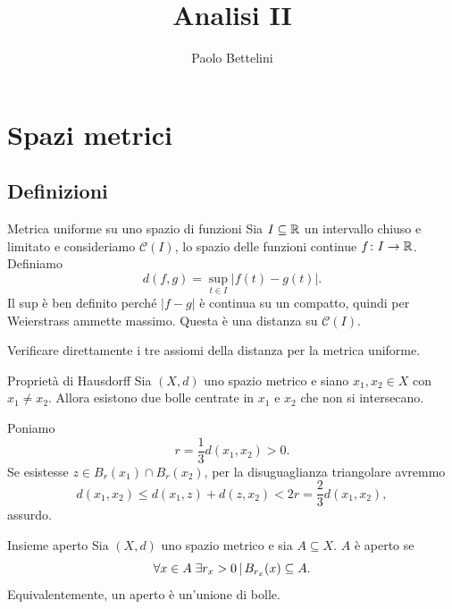 \documentclass[a4paper]{article}
\title{Analisi II}
\author{Paolo Bettelini}
\date{}
\begin{document}
\maketitle
\tableofcontents

\section{Spazi metrici}

\subsection{Definizioni}

\begin{snippetexample}{Metrica uniforme su uno spazio di funzioni}
    Sia \(I\subseteq\mathbb{R}\) un intervallo chiuso e limitato e consideriamo
    \(\mathcal{C}(I)\), lo spazio delle funzioni continue \(f\colon I\to\mathbb{R}\).
    Definiamo
    \[
        d(f,g)=\sup_{t\in I}|f(t)-g(t)|.
    \]
    Il sup è ben definito perché \(|f-g|\) è continua su un compatto, quindi per Weierstrass
    ammette massimo. Questa è una distanza su \(\mathcal{C}(I)\).
\end{snippetexample}

\begin{snippetexercise}{}
    Verificare direttamente i tre assiomi della distanza per la metrica uniforme.
\end{snippetexercise}

\begin{snippetproposition}{Proprietà di Hausdorff}
    Sia \((X,d)\) uno spazio metrico e siano \(x_1,x_2\in X\) con \(x_1\neq x_2\).
    Allora esistono due bolle centrate in \(x_1\) e \(x_2\) che non si intersecano.
\end{snippetproposition}

\begin{snippetproof}{}
    Poniamo
    \[
        r=\frac13 d(x_1,x_2)>0.
    \]
    Se esistesse \(z\in B_r(x_1)\cap B_r(x_2)\), per la disuguaglianza triangolare avremmo
    \[
        d(x_1,x_2)\leq d(x_1,z)+d(z,x_2)<2r=\frac23d(x_1,x_2),
    \]
    assurdo.
\end{snippetproof}

\begin{snippetdefinition}{Insieme aperto}
    Sia \((X,d)\) uno spazio metrico e sia \(A\subseteq X\).
    \(A\) è aperto se
    \[
        \forall x\in A\;\exists r_x>0 \,|\, B_{r_x}(x)\subseteq A.
    \]
    Equivalentemente, un aperto è un'unione di bolle.
\end{snippetdefinition}
\end{document}
